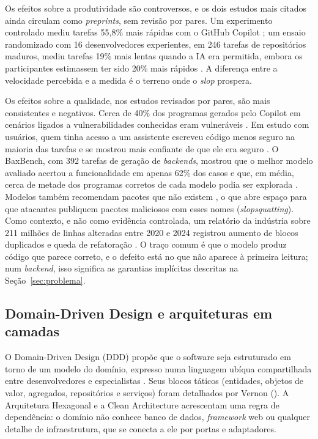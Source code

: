\documentclass[a4paper,12pt]{article}
\newcommand{\estr}[1]{\textit{#1}}
\begin{document}
Os efeitos sobre a produtividade são controversos, e os dois estudos mais citados ainda circulam como \estr{preprints}, sem revisão por pares. Um experimento controlado mediu tarefas 55,8\% mais rápidas com o GitHub Copilot \citep{peng2023}; um ensaio randomizado com 16 desenvolvedores experientes, em 246 tarefas de repositórios maduros, mediu tarefas 19\% mais lentas quando a IA era permitida, embora os participantes estimassem ter sido 20\% mais rápidos \citep{becker2025}. A diferença entre a velocidade percebida e a medida é o terreno onde o \estr{slop} prospera.

Os efeitos sobre a qualidade, nos estudos revisados por pares, são mais consistentes e negativos. Cerca de 40\% dos programas gerados pelo Copilot em cenários ligados a vulnerabilidades conhecidas eram vulneráveis \citep{pearce2022}. Em estudo com usuários, quem tinha acesso a um assistente escreveu código menos seguro na maioria das tarefas e se mostrou mais confiante de que ele era seguro \citep{perry2023}. O BaxBench, com 392 tarefas de geração de \estr{backends}, mostrou que o melhor modelo avaliado acertou a funcionalidade em apenas 62\% dos casos e que, em média, cerca de metade dos programas corretos de cada modelo podia ser explorada \citep{vero2025}. Modelos também recomendam pacotes que não existem \citep{spracklen2025}, o que abre espaço para que atacantes publiquem pacotes maliciosos com esses nomes (\estr{slopsquatting}). Como contexto, e não como evidência controlada, um relatório da indústria sobre 211 milhões de linhas alteradas entre 2020 e 2024 registrou aumento de blocos duplicados e queda de refatoração \citep{gitclear2025}. O traço comum é que o modelo produz código que parece correto, e o defeito está no que não aparece à primeira leitura; num \estr{backend}, isso significa as garantias implícitas descritas na Seção~\ref{sec:problema}.

\subsection{Domain-Driven Design e arquiteturas em camadas}

O Domain-Driven Design (DDD) propõe que o software seja estruturado em torno de um modelo do domínio, expresso numa linguagem ubíqua compartilhada entre desenvolvedores e especialistas \citep{evans2004}. Seus blocos táticos (entidades, objetos de valor, agregados, repositórios e serviços) foram detalhados por Vernon (\citeyear{vernon2013}). A Arquitetura Hexagonal \citep{cockburn2005} e a Clean Architecture \citep{martin2018} acrescentam uma regra de dependência: o domínio não conhece banco de dados, \estr{framework} web ou qualquer detalhe de infraestrutura, que se conecta a ele por portas e adaptadores.
\end{document}
